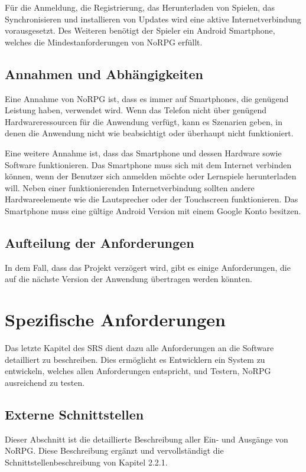		Für die Anmeldung, die Registrierung, das Herunterladen von Spielen, das Synchronisieren und installieren von Updates wird eine aktive Internetverbindung vorausgesetzt. Des Weiteren benötigt der Spieler ein Android Smartphone, welches die Mindestanforderungen von NoRPG erfüllt.
				
	\subsection{Annahmen und Abhängigkeiten}
		Eine Annahme von NoRPG ist, dass es immer auf Smartphones, die genügend Leistung haben, verwendet wird. Wenn das Telefon nicht über genügend Hardwareressourcen für die Anwendung verfügt, kann es Szenarien geben, in denen die Anwendung nicht wie beabsichtigt oder überhaupt nicht funktioniert.
		
		Eine weitere Annahme ist, dass das Smartphone und dessen Hardware sowie Software funktionieren. Das Smartphone muss sich mit dem Internet verbinden können, wenn der Benutzer sich anmelden möchte oder Lernspiele herunterladen will. Neben einer funktionierenden Internetverbindung sollten andere Hardwareelemente wie die Lautsprecher oder der Touchscreen funktionieren. Das Smartphone muss eine gültige Android Version mit einem Google Konto besitzen.
		
	\subsection{Aufteilung der Anforderungen}
		In dem Fall, dass das Projekt verzögert wird, gibt es einige Anforderungen, die auf die nächste Version der Anwendung übertragen werden könnten.

\section{Spezifische Anforderungen}
	Das letzte Kapitel des SRS dient dazu alle Anforderungen an die Software detailliert zu beschreiben. Dies ermöglicht es Entwicklern ein System zu entwickeln, welches allen Anforderungen entspricht, und Testern, NoRPG ausreichend zu testen.
	
	\subsection{Externe Schnittstellen}
		Dieser Abschnitt ist die detaillierte Beschreibung aller Ein- und Ausgänge von NoRPG. Diese Beschreibung ergänzt und vervollständigt die Schnittstellenbeschreibung von Kapitel 2.2.1. 
	
